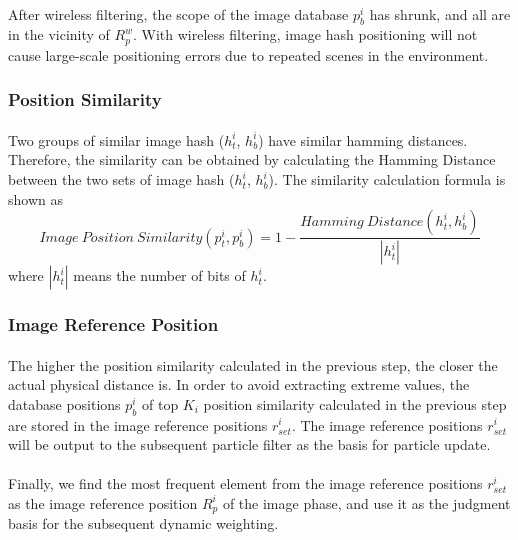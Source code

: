 \documentclass[a4paper,12pt]{report}
\begin{document}
\paragraph{}
After wireless filtering, the scope of the image database $p_b^i$ has shrunk, and all are in the vicinity of $R_p^{w}$. With wireless filtering, image hash positioning will not cause large-scale positioning errors due to repeated scenes in the environment.

\subsubsection{Position Similarity}
\paragraph{}
Two groups of similar image hash ($h_t^{i}$, $h_b^{i}$) have similar hamming distances. Therefore, the similarity can be obtained by calculating the Hamming Distance between the two sets of image hash ($h_t^{i}$, $h_b^{i}$). The similarity calculation formula is shown as
\begin{equation}
\label{equation:image_position_similarity}
Image\ Position\ Similarity(p_t^i, p_b^i) = 1 - \frac{Hamming\ Distance(h_t^i, h_b^{i})}{\left|h_t^i\right|}
\end{equation}
where $\left|h_t^i\right|$ means the number of bits of $h_t^i$.

\subsubsection{Image Reference Position}
\paragraph{}
The higher the position similarity calculated in the previous step, the closer the actual physical distance is. In order to avoid extracting extreme values, the database positions $p_b^i$ of top $K_i$ position similarity calculated in the previous step are stored in the image reference positions $r_{set}^{i}$. The image reference positions $r_{set}^{i}$ will be output to the subsequent particle filter as the basis for particle update.

\paragraph{}
Finally, we find the most frequent element from the image reference positions $r_{set}^{i}$ as the image reference position $R_p^{i}$ of the image phase, and use it as the judgment basis for the subsequent dynamic weighting.
\end{document}
